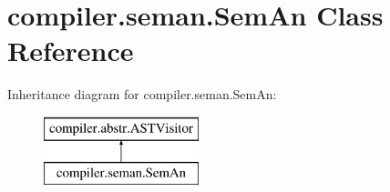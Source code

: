 \hypertarget{classcompiler_1_1seman_1_1_sem_an}{}\section{compiler.\+seman.\+Sem\+An Class Reference}
\label{classcompiler_1_1seman_1_1_sem_an}
Inheritance diagram for compiler.\+seman.\+Sem\+An\+:\begin{figure}[H]
\begin{center}
\leavevmode
\includegraphics[height=2.000000cm]{classcompiler_1_1seman_1_1_sem_an}
\end{center}
\end{figure}
